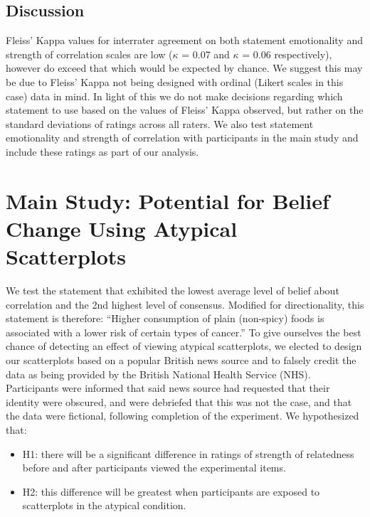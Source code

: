 \documentclass[manuscript,screen,review,anonymous]{acmart}
\providecommand{\tightlist}{%
  \setlength{\itemsep}{0pt}\setlength{\parskip}{0pt}}\usepackage{longtable,booktabs,array}
\begin{document}
\subsection{Discussion}\label{sec-discussion-pre}

Fleiss' Kappa values for interrater agreement on both statement
emotionality and strength of correlation scales are low (\(\kappa\) =
0.07 and \(\kappa\) = 0.06 respectively), however do exceed that which
would be expected by chance. We suggest this may be due to Fleiss' Kappa
not being designed with ordinal (Likert scales in this case) data in
mind. In light of this we do not make decisions regarding which
statement to use based on the values of Fleiss' Kappa observed, but
rather on the standard deviations of ratings across all raters. We also
test statement emotionality and strength of correlation with
participants in the main study and include these ratings as part of our
analysis.

\section{Main Study: Potential for Belief Change Using Atypical
Scatterplots}\label{sec-main-study}

We test the statement that exhibited the lowest average level of belief
about correlation and the 2nd highest level of consensus. Modified for
directionality, this statement is therefore: ``Higher consumption of
plain (non-spicy) foods is associated with a lower risk of certain types
of cancer.'' To give ourselves the best chance of detecting an effect of
viewing atypical scatterplots, we elected to design our scatterplots
based on a popular British news source and to falsely credit the data as
being provided by the British National Health Service (NHS).
Participants were informed that said news source had requested that
their identity were obscured, and were debriefed that this was not the
case, and that the data were fictional, following completion of the
experiment. We hypothesized that:

\begin{itemize}
\tightlist
\item
  H1: there will be a significant difference in ratings of strength of
  relatedness before and after participants viewed the experimental
  items.
\item
  H2: this difference will be greatest when participants are exposed to
  scatterplots in the atypical condition.
\end{itemize}
\end{document}
